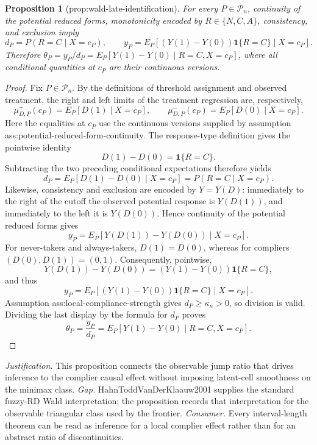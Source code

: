 \documentclass{article}
\newtheorem{proposition}{Proposition}
\begin{document}
\begin{proposition}[prop:wald-late-identification]\label{prop:wald-late-identification}
For every \(P\in\mathcal P_n\), continuity of the potential reduced forms, monotonicity encoded by \(R\in\{N,C,A\}\), consistency, and exclusion imply \[d_P=P(R=C\mid X=c_P),\qquad y_P=E_P[(Y(1)-Y(0))\mathbf 1\{R=C\}\mid X=c_P].\] Therefore \(\theta_P=y_P/d_P=E_P[Y(1)-Y(0)\mid R=C,X=c_P]\), where all conditional quantities at \(c_P\) are their continuous versions.
\end{proposition}
\begin{proof}
Fix \(P\in\mathcal P_n\).  By the definitions of threshold assignment and observed treatment, the right and left limits of the treatment regression are, respectively,
\[
 \mu^+_{D,P}(c_P)=E_P[D(1)\mid X=c_P],\qquad
 \mu^-_{D,P}(c_P)=E_P[D(0)\mid X=c_P].
\]
Here the equalities at \(c_P\) use the continuous versions supplied by assumption ass:potential-reduced-form-continuity.  The response-type definition gives the pointwise identity
\[
 D(1)-D(0)=\mathbf 1\{R=C\}.
\]
Subtracting the two preceding conditional expectations therefore yields
\[
 d_P=E_P[D(1)-D(0)\mid X=c_P]=P(R=C\mid X=c_P).
\]
Likewise, consistency and exclusion are encoded by \(Y=Y(D)\): immediately to the right of the cutoff the observed potential response is \(Y(D(1))\), and immediately to the left it is \(Y(D(0))\).  Hence continuity of the potential reduced forms gives
\[
 y_P=E_P[Y(D(1))-Y(D(0))\mid X=c_P].
\]
For never-takers and always-takers, \(D(1)=D(0)\), whereas for compliers \((D(0),D(1))=(0,1)\).  Consequently, pointwise,
\[
 Y(D(1))-Y(D(0))=(Y(1)-Y(0))\mathbf 1\{R=C\},
\]
and thus
\[
 y_P=E_P[(Y(1)-Y(0))\mathbf 1\{R=C\}\mid X=c_P].
\]
Assumption ass:local-compliance-strength gives \(d_P\ge\kappa_n>0\), so division is valid.  Dividing the last display by the formula for \(d_P\) proves
\[
 \theta_P=\frac{y_P}{d_P}=E_P[Y(1)-Y(0)\mid R=C,X=c_P].
\]
\end{proof}
\par\smallskip\noindent \textit{Justification.} This proposition connects the observable jump ratio that drives inference to the complier causal effect without imposing latent-cell smoothness on the minimax class. \textit{Gap.} HahnToddVanDerKlaauw2001 supplies the standard fuzzy-RD Wald interpretation; the proposition records that interpretation for the observable triangular class used by the frontier. \textit{Consumer.} Every interval-length theorem can be read as inference for a local complier effect rather than for an abstract ratio of discontinuities.
\end{document}
